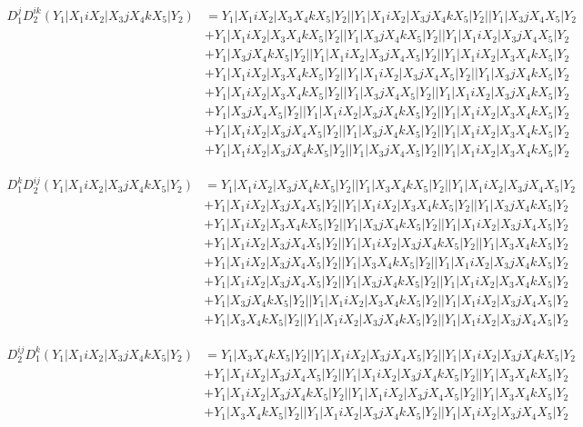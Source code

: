 \documentclass{article}[12pt]
\begin{document}
\begin{align*}
D_1^jD_2^{ik}(Y_1|X_1iX_2|X_3jX_4kX_5|Y_2)& =Y_1|X_1iX_2|X_3X_4kX_5|Y_2||Y_1|X_1iX_2|X_3jX_4kX_5|Y_2||Y_1|X_3jX_4X_5|Y_2\\ 
 & +Y_1|X_1iX_2|X_3X_4kX_5|Y_2||Y_1|X_3jX_4kX_5|Y_2||Y_1|X_1iX_2|X_3jX_4X_5|Y_2\\ 
 & +Y_1|X_3jX_4kX_5|Y_2||Y_1|X_1iX_2|X_3jX_4X_5|Y_2||Y_1|X_1iX_2|X_3X_4kX_5|Y_2\\ 
 & +Y_1|X_1iX_2|X_3X_4kX_5|Y_2||Y_1|X_1iX_2|X_3jX_4X_5|Y_2||Y_1|X_3jX_4kX_5|Y_2\\ 
 & +Y_1|X_1iX_2|X_3X_4kX_5|Y_2||Y_1|X_3jX_4X_5|Y_2||Y_1|X_1iX_2|X_3jX_4kX_5|Y_2\\ 
 & +Y_1|X_3jX_4X_5|Y_2||Y_1|X_1iX_2|X_3jX_4kX_5|Y_2||Y_1|X_1iX_2|X_3X_4kX_5|Y_2\\ 
 & +Y_1|X_1iX_2|X_3jX_4X_5|Y_2||Y_1|X_3jX_4kX_5|Y_2||Y_1|X_1iX_2|X_3X_4kX_5|Y_2\\ 
 & +Y_1|X_1iX_2|X_3jX_4kX_5|Y_2||Y_1|X_3jX_4X_5|Y_2||Y_1|X_1iX_2|X_3X_4kX_5|Y_2\end{align*}

\begin{align*}
D_1^kD_2^{ij}(Y_1|X_1iX_2|X_3jX_4kX_5|Y_2)& =Y_1|X_1iX_2|X_3jX_4kX_5|Y_2||Y_1|X_3X_4kX_5|Y_2||Y_1|X_1iX_2|X_3jX_4X_5|Y_2\\ 
 & +Y_1|X_1iX_2|X_3jX_4X_5|Y_2||Y_1|X_1iX_2|X_3X_4kX_5|Y_2||Y_1|X_3jX_4kX_5|Y_2\\ 
 & +Y_1|X_1iX_2|X_3X_4kX_5|Y_2||Y_1|X_3jX_4kX_5|Y_2||Y_1|X_1iX_2|X_3jX_4X_5|Y_2\\ 
 & +Y_1|X_1iX_2|X_3jX_4X_5|Y_2||Y_1|X_1iX_2|X_3jX_4kX_5|Y_2||Y_1|X_3X_4kX_5|Y_2\\ 
 & +Y_1|X_1iX_2|X_3jX_4X_5|Y_2||Y_1|X_3X_4kX_5|Y_2||Y_1|X_1iX_2|X_3jX_4kX_5|Y_2\\ 
 & +Y_1|X_1iX_2|X_3jX_4X_5|Y_2||Y_1|X_3jX_4kX_5|Y_2||Y_1|X_1iX_2|X_3X_4kX_5|Y_2\\ 
 & +Y_1|X_3jX_4kX_5|Y_2||Y_1|X_1iX_2|X_3X_4kX_5|Y_2||Y_1|X_1iX_2|X_3jX_4X_5|Y_2\\ 
 & +Y_1|X_3X_4kX_5|Y_2||Y_1|X_1iX_2|X_3jX_4kX_5|Y_2||Y_1|X_1iX_2|X_3jX_4X_5|Y_2\end{align*}

\begin{align*}
D_2^{ij}D_1^k(Y_1|X_1iX_2|X_3jX_4kX_5|Y_2)& =Y_1|X_3X_4kX_5|Y_2||Y_1|X_1iX_2|X_3jX_4X_5|Y_2||Y_1|X_1iX_2|X_3jX_4kX_5|Y_2\\ 
 & +Y_1|X_1iX_2|X_3jX_4X_5|Y_2||Y_1|X_1iX_2|X_3jX_4kX_5|Y_2||Y_1|X_3X_4kX_5|Y_2\\ 
 & +Y_1|X_1iX_2|X_3jX_4kX_5|Y_2||Y_1|X_1iX_2|X_3jX_4X_5|Y_2||Y_1|X_3X_4kX_5|Y_2\\ 
 & +Y_1|X_3X_4kX_5|Y_2||Y_1|X_1iX_2|X_3jX_4kX_5|Y_2||Y_1|X_1iX_2|X_3jX_4X_5|Y_2\end{align*}
\end{document}

